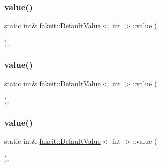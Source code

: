 \subsubsection{\texorpdfstring{value()}{value()}\hspace{0.1cm}{\footnotesize\ttfamily [1/9]}}
{\footnotesize\ttfamily static int\& \mbox{\hyperlink{structfakeit_1_1DefaultValue}{fakeit\+::\+Default\+Value}}$<$ int $>$\+::value (\begin{DoxyParamCaption}{ }\end{DoxyParamCaption})\hspace{0.3cm}{\ttfamily [inline]}, {\ttfamily [static]}}

\mbox{\label{structfakeit_1_1DefaultValue_3_01int_01_4_a16688fb9ddd5fe0abef6efabc99daccb}} 
\subsubsection{\texorpdfstring{value()}{value()}\hspace{0.1cm}{\footnotesize\ttfamily [2/9]}}
{\footnotesize\ttfamily static int\& \mbox{\hyperlink{structfakeit_1_1DefaultValue}{fakeit\+::\+Default\+Value}}$<$ int $>$\+::value (\begin{DoxyParamCaption}{ }\end{DoxyParamCaption})\hspace{0.3cm}{\ttfamily [inline]}, {\ttfamily [static]}}

\mbox{\label{structfakeit_1_1DefaultValue_3_01int_01_4_a16688fb9ddd5fe0abef6efabc99daccb}} 
\subsubsection{\texorpdfstring{value()}{value()}\hspace{0.1cm}{\footnotesize\ttfamily [3/9]}}
{\footnotesize\ttfamily static int\& \mbox{\hyperlink{structfakeit_1_1DefaultValue}{fakeit\+::\+Default\+Value}}$<$ int $>$\+::value (\begin{DoxyParamCaption}{ }\end{DoxyParamCaption})\hspace{0.3cm}{\ttfamily [inline]}, {\ttfamily [static]}}


